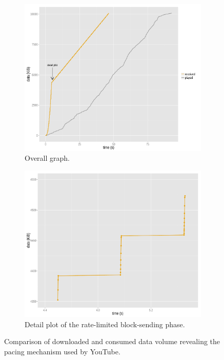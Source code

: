 \begin{figure}[htbp]
	\centering
	\begin{subfigure}[b]{0.9\textwidth}
		\centering
		\includegraphics[width=\textwidth]{images/R-blocktransfer.pdf}
		\caption{Overall graph.}
		\label{c3:fig:blocktransfer-overall}
	\end{subfigure}

	\begin{subfigure}[b]{0.9\textwidth}
		\centering
		\includegraphics[width=\textwidth]{images/R-blocktransferdetail.pdf}
		\caption{Detail plot of the rate-limited block-sending phase.}
		\label{c3:fig:blocktransfer-detail}
	\end{subfigure}
\caption{Comparison of downloaded and consumed data volume revealing the pacing mechanism used by YouTube.}
\label{c3:fig:blocktransfer}
\end{figure}


